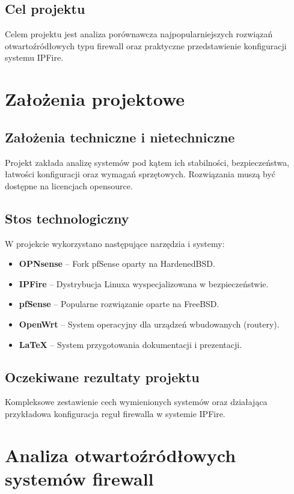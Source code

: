 \documentclass[12pt,a4paper]{article}
\begin{document}
\subsection{Cel projektu}
Celem projektu jest analiza porównawcza najpopularniejszych rozwiązań otwartoźródłowych typu firewall oraz praktyczne przedstawienie konfiguracji systemu IPFire.





\newpage
\section{Założenia projektowe}
\subsection{Założenia techniczne i nietechniczne}
Projekt zakłada analizę systemów pod kątem ich stabilności, bezpieczeństwa, łatwości konfiguracji oraz wymagań sprzętowych. Rozwiązania muszą być dostępne na licencjach opensource.

\subsection{Stos technologiczny}
W projekcie wykorzystano następujące narzędzia i systemy:
\begin{itemize}
	\item \textbf{OPNsense} – Fork pfSense oparty na HardenedBSD.
	\item \textbf{IPFire} – Dystrybucja Linuxa wyspecjalizowana w bezpieczeństwie.
	\item \textbf{pfSense} – Popularne rozwiązanie oparte na FreeBSD.
	\item \textbf{OpenWrt} – System operacyjny dla urządzeń wbudowanych (routery).
	\item \textbf{LaTeX} – System przygotowania dokumentacji i prezentacji.
\end{itemize}

\subsection{Oczekiwane rezultaty projektu}
Kompleksowe zestawienie cech wymienionych systemów oraz działająca przykładowa konfiguracja reguł firewalla w systemie IPFire.





\newpage
\section{Analiza otwartoźródłowych systemów firewall}
\end{document}
